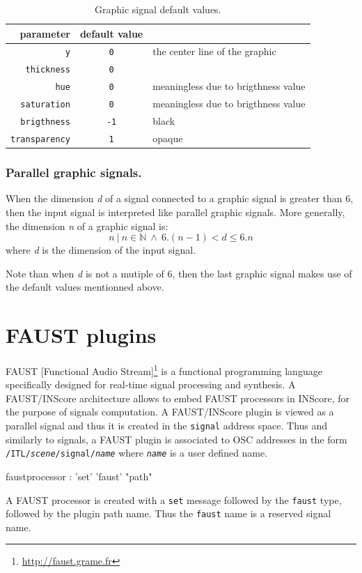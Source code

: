 \documentclass[a4paper,twoside]{report}
\newcommand{\toplevel}[1]	{\chapter{#1}}
\newcommand{\subsublevel}[1]	{\subsection{#1}}
\newcommand{\OSC}[1]		{\texttt{#1}}
\begin{document}
\begin{table}[htdp]
\caption{Graphic signal default values.}
\begin{center}
\begin{tabular}{|r|cl|}
\hline
parameter & default value & \\
\hline
\OSC{y}					& \OSC{0} & the center line of the graphic \\
\OSC{thickness}		& \OSC{0} & \\
\OSC{hue}				& \OSC{0} & meaningless due to brigthness value \\
\OSC{saturation}		& \OSC{0} & meaningless due to brigthness value \\
\OSC{brigthness}		& \OSC{-1} & black \\
\OSC{transparency}		& \OSC{1} & opaque \\
\hline
\end{tabular}
\end{center}
\label{gsigdefault}
\end{table}

\subsublevel{Parallel graphic signals.}
\label{pgsignal}
When the dimension \textit{d} of a signal connected to a graphic signal is greater than 6, then the input signal is interpreted like parallel graphic signals. More generally, the dimension \textit{n} of a graphic signal is:
\[
n  \  |\ n \in \mathbb{N}\ \land\ 6.(n-1) < d \leqslant 6.n
\]
where \textit{d} is the dimension of the input signal.

Note than when \textit{d} is not a mutiple of 6, then the last graphic signal makes use of the default values mentionned above.


\toplevel{FAUST plugins}
\label{faust}

FAUST [Functional Audio Stream]\footnote{\url{http://faust.grame.fr}} is a functional programming language specifically designed for real-time signal processing and synthesis. A FAUST/INScore architecture allows to embed FAUST processors in INScore, for the purpose of signals computation. A FAUST/INScore plugin is viewed as a parallel signal and thus it is created in the \OSC{signal} address space. Thus and similarly to signals, a FAUST plugin is associated to OSC addresses in the form \OSC{/ITL/\emph{scene}/signal/\emph{name}} where \OSC{\emph{name}} is a user defined name.

\begin{rail}
faustprocessor : 'set' 'faust' "path"
\end{rail}
A FAUST processor is created with a \OSC{set} message followed by the \OSC{faust} type, followed by the plugin path name. Thus the \OSC{faust} name is a reserved signal name.
\end{document}
